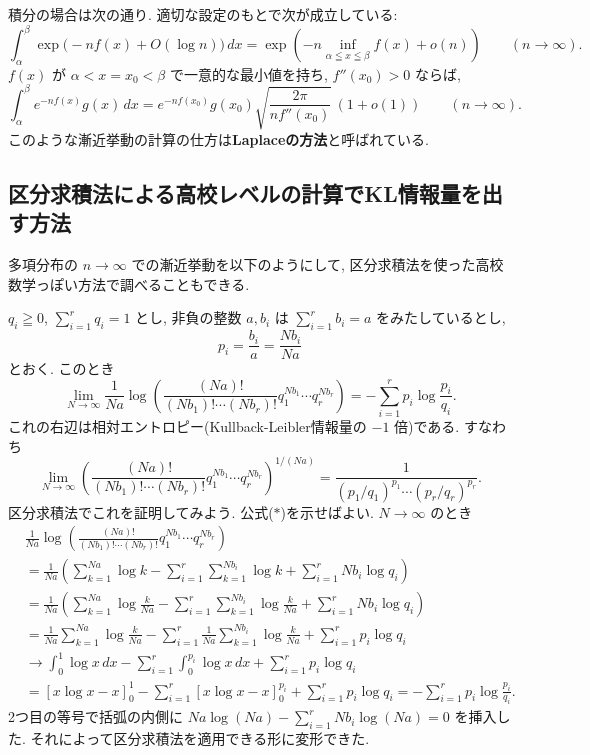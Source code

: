\documentclass[12pt,twoside]{jarticle}
\theoremstyle{definition} %
\theoremstyle{definition} %
\theoremstyle{definition} %
\numberwithin{theorem}{section}
\numberwithin{equation}{section}
\numberwithin{figure}{section}
\numberwithin{table}{section}
\begin{document}
積分の場合は次の通り.
適切な設定のもとで次が成立している:
\[
\int_\alpha^\beta \exp\biggl(-nf(x)+O(\log n)\biggr)\,dx
=
\exp\left(-n\inf_{\alpha\leqq x\leqq\beta} f(x) + o(n)\right)
\qquad
(n\to\infty).
\]
$f(x)$ が $\alpha<x=x_0<\beta$ で一意的な最小値を持ち, 
$f''(x_0)>0$ ならば,
\[
\int_\alpha^\beta e^{-nf(x)}g(x)\,dx
=
e^{-nf(x_0)}g(x_0)\sqrt{\frac{2\pi}{n f''(x_0)}}\,(1+o(1))
\qquad
(n\to\infty).
\]
このような漸近挙動の計算の仕方は{\bf Laplaceの方法}と呼ばれている.


\subsection{区分求積法による高校レベルの計算でKL情報量を出す方法}
\label{sec:quadrature-by-parts}

多項分布の $n\to\infty$ での漸近挙動を以下のようにして, 
区分求積法を使った高校数学っぽい方法で調べることもできる.

$q_i\geqq 0$, $\sum_{i=1}^r q_i=1$ とし, 
非負の整数 $a,b_i$ は $\sum_{i=1}^r b_i=a$ をみたしているとし, 
\[
p_i=\frac{b_i}{a}=\frac{Nb_i}{Na}
\]とおく.  このとき
\[
\lim_{N\to\infty}\frac{1}{Na}
\log\left(\frac{(Na)!}{(Nb_1)!\cdots(Nb_r)!}q_1^{Nb_1}\cdots q_r^{Nb_r}\right)
=-\sum_{i=1}^r p_i\log\frac{p_i}{q_i}.
\tag{$*$}
\]
これの右辺は相対エントロピー(Kullback-Leibler情報量の $-1$ 倍)である. 
すなわち
\[
\lim_{N\to\infty}
\left(\frac{(Na)!}{(Nb_1)!\cdots(Nb_r)!}q_1^{Nb_1}\cdots q_r^{Nb_r}\right)^{1/(Na)}
=\frac{1}{(p_1/q_1)^{p_1}\cdots (p_r/q_r)^{p_r}}.
\]
区分求積法でこれを証明してみよう. 公式($*$)を示せばよい. $N\to\infty$ のとき
\begin{align*}
&
\frac{1}{Na}
\log\left(\frac{(Na)!}{(Nb_1)!\cdots(Nb_r)!}q_1^{Nb_1}\cdots q_r^{Nb_r}\right)
\\ &
=\frac{1}{Na}
\left(
\sum_{k=1}^{Na}\log k
-\sum_{i=1}^r\sum_{k=1}^{Nb_i}\log k
+\sum_{i=1}^rNb_i\log q_i
\right)
\\ &
=\frac{1}{Na}
\left(
\sum_{k=1}^{Na}\log \frac{k}{Na}
-\sum_{i=1}^r\sum_{k=1}^{Nb_i}\log \frac{k}{Na}
+\sum_{i=1}^rNb_i\log q_i
\right)
\\ &
=\frac{1}{Na}\sum_{k=1}^{Na}\log \frac{k}{Na}
-\sum_{i=1}^r\frac{1}{Na}\sum_{k=1}^{Nb_i}\log \frac{k}{Na}
+\sum_{i=1}^r p_i\log q_i
\\ &
\to
\int_0^1 \log x\,dx 
- \sum_{i=1}^r\int_0^{p_i}\log x\,dx 
+ \sum_{i=1}^r p_i\log q_i
\\ &
=[x\log x-x]_0^1
-\sum_{i=1}^r[x\log x-x]_0^{p_i}
+\sum_{i=1}^r p_i\log q_i
=-\sum_{i=1}^r p_i\log\frac{p_i}{q_i}.
\end{align*}
2つ目の等号で括弧の内側に
\(
Na\log(Na)-\sum_{i=1}^rNb_i\log(Na)=0
\)
を挿入した. それによって区分求積法を適用できる形に変形できた.
\end{document}
